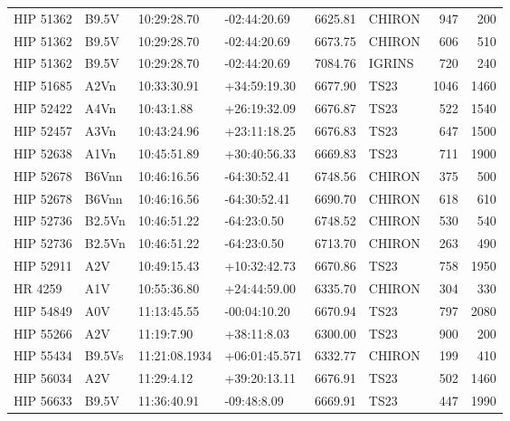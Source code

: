 \documentclass{emulateapj}
\begin{document}
\begin{longtable*}{|l|lllrlrr|}
   HIP 51362 &          B9.5V &    10:29:28.70 &   -02:44:20.69 &  6625.81 &     CHIRON &      947 &     200 \\
   HIP 51362 &          B9.5V &    10:29:28.70 &   -02:44:20.69 &  6673.75 &     CHIRON &      606 &     510 \\
   HIP 51362 &          B9.5V &    10:29:28.70 &   -02:44:20.69 &  7084.76 &     IGRINS &      720 &     240 \\
   HIP 51685 &           A2Vn &    10:33:30.91 &   +34:59:19.30 &  6677.90 &       TS23 &     1046 &    1460 \\
   HIP 52422 &           A4Vn &     10:43:1.88 &   +26:19:32.09 &  6676.87 &       TS23 &      522 &    1540 \\
   HIP 52457 &           A3Vn &    10:43:24.96 &   +23:11:18.25 &  6676.83 &       TS23 &      647 &    1500 \\
   HIP 52638 &           A1Vn &    10:45:51.89 &   +30:40:56.33 &  6669.83 &       TS23 &      711 &    1900 \\
   HIP 52678 &          B6Vnn &    10:46:16.56 &   -64:30:52.41 &  6748.56 &     CHIRON &      375 &     500 \\
   HIP 52678 &          B6Vnn &    10:46:16.56 &   -64:30:52.41 &  6690.70 &     CHIRON &      618 &     610 \\
   HIP 52736 &         B2.5Vn &    10:46:51.22 &    -64:23:0.50 &  6748.52 &     CHIRON &      530 &     540 \\
   HIP 52736 &         B2.5Vn &    10:46:51.22 &    -64:23:0.50 &  6713.70 &     CHIRON &      263 &     490 \\
   HIP 52911 &            A2V &    10:49:15.43 &   +10:32:42.73 &  6670.86 &       TS23 &      758 &    1950 \\
     HR 4259 &            A1V &    10:55:36.80 &   +24:44:59.00 &  6335.70 &     CHIRON &      304 &     330 \\
   HIP 54849 &            A0V &    11:13:45.55 &   -00:04:10.20 &  6670.94 &       TS23 &      797 &    2080 \\
   HIP 55266 &            A2V &     11:19:7.90 &    +38:11:8.03 &  6300.00 &       TS23 &      900 &     200 \\
   HIP 55434 &         B9.5Vs &  11:21:08.1934 &  +06:01:45.571 &  6332.77 &     CHIRON &      199 &     410 \\
   HIP 56034 &            A2V &     11:29:4.12 &   +39:20:13.11 &  6676.91 &       TS23 &      502 &    1460 \\
   HIP 56633 &          B9.5V &    11:36:40.91 &    -09:48:8.09 &  6669.91 &       TS23 &      447 &    1990 \\

\end{longtable*}
\end{document}
